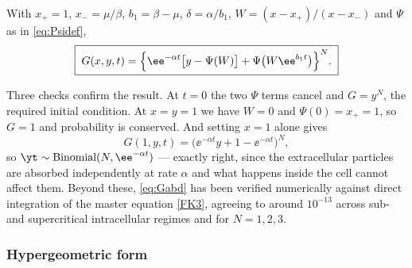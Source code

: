 \begin{proposition}
\label{prop:Gabd}
With $x_+=1$, $x_-=\mu/\beta$, $b_1 = \beta-\mu$, $\delta = \alpha/b_1$,
$W = (x-x_+)/(x-x_-)$ and $\Psi$ as in \cref{eq:Psidef},
\begin{equation}
\label{eq:Gabd}
\boxed{\;
G(x,y,t) = \Bigl\{\ee^{-\alpha t}\bigl[y - \Psi(W)\bigr] + \Psi\bigl(W\ee^{b_1 t}\bigr)\Bigr\}^{N}. \;}
\end{equation}
\end{proposition}

Three checks confirm the result. At $t=0$ the two $\Psi$ terms cancel and $G = y^N$, the
required initial condition. At $x=y=1$ we have $W=0$ and $\Psi(0)=x_+=1$, so $G=1$ and
probability is conserved. And setting $x=1$ alone gives
\begin{equation*}
G(1,y,t) = \bigl(\ee^{-\alpha t}y + 1 - \ee^{-\alpha t}\bigr)^N,
\end{equation*}
so $\yt\sim\text{Binomial}(N,\ee^{-\alpha t})$ --- exactly right, since the extracellular
particles are absorbed independently at rate $\alpha$ and what happens inside the cell
cannot affect them. Beyond these, \cref{eq:Gabd} has been verified numerically against
direct integration of the master equation \cref{FK3}, agreeing to around $10^{-13}$
across sub- and supercritical intracellular regimes and for $N=1,2,3$.

\subsubsection*{Hypergeometric form}

